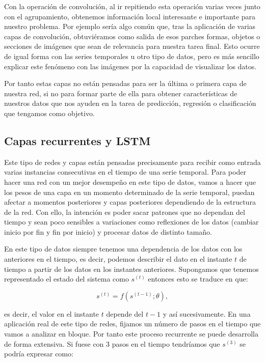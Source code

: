 Con la operación de convolución, al ir repitiendo esta operación varias veces junto con el agrupamiento, obtenemos información local interesante e importante para nuestro problema. Por ejemplo sería algo común que, tras la aplicación de varias capas de convolución, obtuviéramos como salida de esos parches formas, objetos o secciones de imágenes que sean de relevancia para nuestra tarea final. Esto ocurre de igual forma con las series temporales u otro tipo de datos, pero es más sencillo explicar este fenómeno con las imágenes por la capacidad de visualizar los datos.

Por tanto estas capas no están pensadas para ser la última o primera capa de nuestra red, si no para formar parte de ella para obtener características de nuestros datos que nos ayuden en la tarea de predicción, regresión o clasificación que tengamos como objetivo.

\subsection{Capas recurrentes y LSTM}

Este tipo de redes y capas están pensadas precisamente para recibir como entrada varias instancias consecutivas en el tiempo de una serie temporal. Para poder hacer una red con un mejor desempeño en este tipo de datos, vamos a hacer que los pesos de una capa en un momento determinado de la serie temporal, puedan afectar a momentos posteriores y capas posteriores dependiendo de la estructura de la red. Con ello, la intención es poder sacar patrones que no dependan del tiempo y sean poco sensibles a variaciones como reflexiones de los datos (cambiar inicio por fin y fin por inicio) y procesar datos de distinto tamaño.

En este tipo de datos siempre tenemos una dependencia de los datos con los anteriores en el tiempo, es decir, podemos describir el dato en el instante $t$ de tiempo a partir de los datos en los instantes anteriores. Supongamos que tenemos representado el estado del sistema como $s^{(t)}$ entonces esto se traduce en que:

$$s^{(t)} = f(s^{(t-1)};\theta),$$

es decir, el valor en el instante $t$ depende del $t-1$ y así sucesivamente. En una aplicación real de este tipo de redes, fijamos un número de pasos en el tiempo que vamos a analizar en bloque. Por tanto este proceso recurrente se puede desarrolla de forma extensiva. Si fuese con 3 pasos en el tiempo tendríamos que $s^{(3)}$ se podría expresar como:

